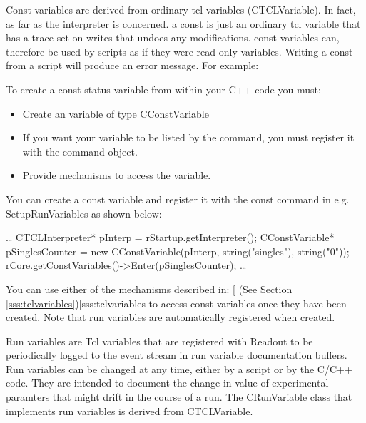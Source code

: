 	Const variables are derived from ordinary tcl variables (CTCLVariable).
	In fact, as far as the interpreter is concerned. a const is just an
	ordinary tcl variable that has a trace set on writes that undoes
	any modifications. const variables can, therefore be used by
	scripts as if they were read-only variables.  Writing a const from
	a script will produce an error message.  For example:
	\begin{example}
	    \computer{\%} 
	    \computer{\%} 
	    \computer{\%}
	\end{example}

	To create a const status variable from within your C++ code you 
	must:
	\begin{itemize}
	    \item Create an variable of type CConstVariable
	    \item If you want your variable to be listed by the
		   command, you must register it
		  with the  command object.
	    \item Provide mechanisms to access the variable.
	\end{itemize}
   
	 You can create a const variable and register it with the const command
	 in e.g. SetupRunVariables as
	 shown below:
	 \begin{example}
	    \ldots
	       CTCLInterpreter* pInterp           = rStartup.getInterpreter();
	       CConstVariable* pSinglesCounter = 
			new CConstVariable(pInterp, string("singles"), string("0"));
	       rCore.getConstVariables()->Enter(pSinglesCounter);
	    \ldots
	 \end{example}

	 You can use either of the mechanisms described in:
	 [
	    (See Section \ref{sss:tclvariables})]{sss:tclvariables} 
	 to access const variables once they have been created.  Note
         that run variables are automatically registered when created.
         
          
 	
      Run variables are Tcl variables that are registered with Readout
      to be periodically logged to the event stream in run variable
      documentation buffers.  Run variables can be changed at any time,
      either by a script or by the C/C++ code.  They are intended to document
      the change in value of experimental paramters that might drift in the
      course of a run.  The CRunVariable class that implements run variables
      is derived from CTCLVariable.
      
